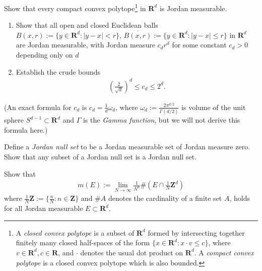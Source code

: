 \documentclass{book}
\theoremstyle{defstyle}
\theoremstyle{thmstyle}
\begin{document}
\begin{example}
    Show that every compact convex polytope\footnote{A \emph{closed convex polytope} is a subset of $\mathbf{R}^d$ formed by intersecting together finitely many closed half-spaces of the form $\{x \in \mathbf{R}^d : x \cdot v \leq c\}$, where $v \in \mathbf{R}^d, c \in \mathbf{R}$, and $\cdot$ denotes the usual dot product on $\mathbf{R}^d$. A \emph{compact convex polytope} is a closed convex polytope which is also bounded.} in $\mathbf{R}^d$ is Jordan measurable.
\end{example}

\begin{example}\label{exe:compact convex polytope is jordan measurable}
    \quad
    \begin{enumerate}[label = (\arabic*)]
        \item Show that all open and closed Euclidean balls $B(x, r) := \{y \in \mathbf{R}^d : |y - x| < r\}$, $\overline{B(x, r)} := \{y \in \mathbf{R}^d : |y - x| \leq r\}$ in $\mathbf{R}^d$ are Jordan measurable, with Jordan measure $c_dr^d$ for some constant $c_d > 0$ depending only on $d$
        \item Establish the crude bounds
            \begin{align*}
                \left(\frac{2}{\sqrt{d}}\right)^d \leq c_d \leq 2^d.
            \end{align*}
    \end{enumerate}
(An exact formula for $c_d$ is $c_d = \frac{1}{d}\omega_d$, where $\omega_d := \frac{2\pi^{d/2}}{\Gamma(d/2)}$ is volume of the unit sphere $S^{d - 1} \subset \mathbf{R}^d$ and $\Gamma$ is the \emph{Gamma function}, but we will not derive this formula here.)
\end{example}


\begin{example}
    Define a \emph{Jordan null set} to be a Jordan measurable set of Jordan measure zero. Show that any subset of a Jordan null set is a Jordan null set.
\end{example}

\begin{example}
    Show that
        \begin{align*}
            m(E) := \lim_{N \to \infty}\frac{1}{N^d}\#(E \cap \frac{1}{N}\mathbf{Z}^d)
        \end{align*}
    where $\frac{1}{N}\mathbf{Z} := \{\frac{n}{N} : n \in \mathbf{Z}\}$ and $\# A$ denotes the cardinality of a finite set $A$, holds for all Jordan measurable $E \subset \mathbf{R}^d$.
\end{example}
\end{document}
